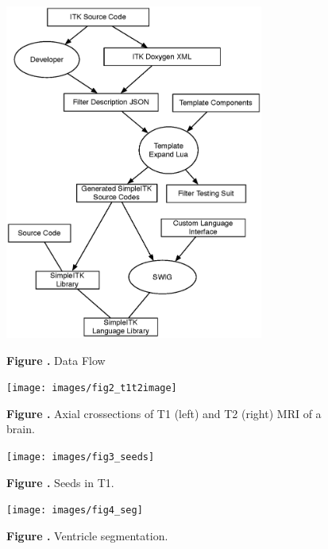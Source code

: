 \documentclass{frontiersMED} %
\begin{document}
\begin{figure}
\begin{center}
\includegraphics[width=8.5cm]{images/fig1_dataflow}
\end{center}
 \textbf{\label{fig:01} Figure .}{ Data Flow }
\end{figure}

\begin{figure}
\begin{center}
\texttt{[image: images/fig2\_t1t2image]}
\end{center}
 \textbf{\label{fig:02} Figure .}{ Axial crossections of T1 (left) and T2 (right) MRI of a brain. }
\end{figure}

\begin{figure}
\begin{center}
\texttt{[image: images/fig3\_seeds]}
\end{center}
 \textbf{\label{fig:03} Figure .}{ Seeds in T1. }
\end{figure}

\begin{figure}
\begin{center}
\texttt{[image: images/fig4\_seg]}
\end{center}
 \textbf{\label{fig:04} Figure .}{ Ventricle segmentation. }
\end{figure}
\end{document}
